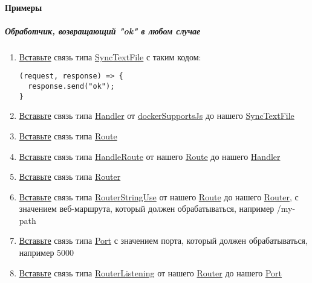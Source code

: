 \paragraph{Примеры}
\subparagraph{Обработчик, возвращающий "ok" в любом случае}
\begin{enumerate}
  \item \hyperlink{DeepCase.InsertLink.Description}{Вставьте} связь типа
        \hyperlink{Core.SyncTextFile.Description}{SyncTextFile} с таким
        кодом:
        \begin{lstlisting}
(request, response) => {
  response.send("ok");
}
\end{lstlisting}
  \item \hyperlink{DeepCase.InsertLink.Description}{Вставьте} связь типа
        \hyperlink{Core.Handler.Description}{Handler} от
        \hyperlink{Core.dockerSupportsJs.Description}{dockerSupportsJs}
        до нашего \hyperlink{Core.SyncTextFile.Description}{SyncTextFile}
  \item \hyperlink{DeepCase.InsertLink.Description}{Вставьте} связь типа
        \hyperlink{Core.Route.Description}{Route}
  \item \hyperlink{DeepCase.InsertLink.Description}{Вставьте} связь типа
        \hyperlink{Core.HandleRoute.Description}{HandleRoute} от нашего
        \hyperlink{Core.Route.Description}{Route} до нашего
        \hyperlink{Core.Handler.Description}{Handler}
  \item \hyperlink{DeepCase.InsertLink.Description}{Вставьте} связь типа
        \hyperlink{Core.Router.Description}{Router}
  \item \hyperlink{DeepCase.InsertLink.Description}{Вставьте} связь типа
        \hyperlink{Core.RouterStringUse.Description}{RouterStringUse} от
        нашего
        \hyperlink{Core.Route.Description}{Route} до нашего
        \hyperlink{Core.Router.Description}{Router},
        с
        значением
        веб-маршрута, который должен обрабатываться, например /my-path
  \item \hyperlink{DeepCase.InsertLink.Description}{Вставьте} связь типа
        \hyperlink{Core.Port.Description}{Port} с значением порта, который
        должен
        обрабатываться, например
        5000
  \item \hyperlink{DeepCase.InsertLink.Description}{Вставьте} связь типа
        \hyperlink{Core.RouterListening.Description}{RouterListening} от
        нашего
        \hyperlink{Core.Router.Description}{Router} до нашего
        \hyperlink{Core.Port.Description}{Port}
\end{enumerate}

